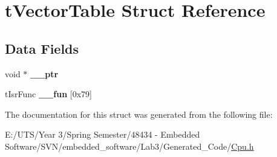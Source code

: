 \hypertarget{structt_vector_table}{}\section{t\+Vector\+Table Struct Reference}
\label{structt_vector_table}
\subsection*{Data Fields}
\begin{DoxyCompactItemize}
\item 
\hypertarget{structt_vector_table_a324d365e9c8c6c033f4edbc906f94844}{}void $\ast$ {\bfseries \+\_\+\+\_\+ptr}\label{structt_vector_table_a324d365e9c8c6c033f4edbc906f94844}

\item 
\hypertarget{structt_vector_table_a6001c7c57c392674cadaf831203e4606}{}t\+Isr\+Func {\bfseries \+\_\+\+\_\+fun} \mbox{[}0x79\mbox{]}\label{structt_vector_table_a6001c7c57c392674cadaf831203e4606}

\end{DoxyCompactItemize}


The documentation for this struct was generated from the following file\+:\begin{DoxyCompactItemize}
\item 
E\+:/\+U\+T\+S/\+Year 3/\+Spring Semester/48434 -\/ Embedded Software/\+S\+V\+N/embedded\+\_\+software/\+Lab3/\+Generated\+\_\+\+Code/\hyperlink{_cpu_8h}{Cpu.\+h}\end{DoxyCompactItemize}
